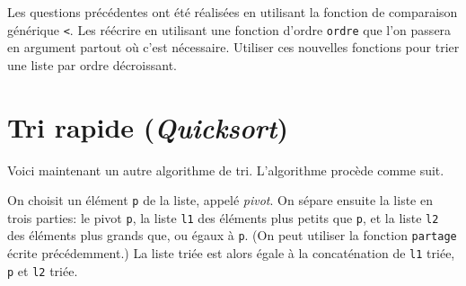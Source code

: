 \documentclass[11pt,a4paper]{article}
\begin{document}
Les questions précédentes ont été réalisées en utilisant la fonction
de comparaison générique \verb+<+. Les réécrire en utilisant une
fonction d'ordre {\tt ordre} que l'on passera en argument partout où
c'est nécessaire.  Utiliser ces nouvelles fonctions pour trier une
liste par ordre décroissant.

\section{Tri rapide (\emph{Quicksort})}

Voici maintenant un autre algorithme de tri. L'algorithme procède
comme suit.

On choisit un élément {\tt p} de la liste, appelé \emph{pivot}. On
sépare ensuite la liste en trois parties: le pivot {\tt p}, la liste
{\tt l1} des éléments plus petits que {\tt p}, et la liste {\tt l2}
des éléments plus grands que, ou égaux à {\tt p}. (On peut utiliser la
fonction {\tt partage} écrite précédemment.) La liste triée est alors
égale à la concaténation de \verb+l1+ triée, {\tt p} et \verb+l2+
triée.
\end{document}
